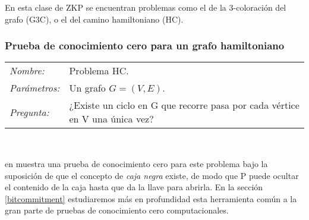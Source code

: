 \hfil

En esta clase de ZKP se encuentran problemas como el de la 3-coloración del grafo (G3C), o el del camino hamiltoniano (HC).


\subsubsection{Prueba de conocimiento cero para un grafo hamiltoniano}

\hfil

\begin{tabular}{|ll}
	\textit{Nombre:} & Problema HC. \\
	\textit{Parámetros:} &Un grafo $G=(V,E)$. \\
	\textit{Pregunta:} & ¿Existe un ciclo en G que recorre pasa por cada vértice en V una única vez? \\
\end{tabular}
\\

\hfil

\citeauthor{blum} en  \citep{blum} muestra una prueba de conocimiento cero para este problema bajo la suposición de que el concepto de \textit{caja negra} existe, de modo que P puede ocultar el contenido de la caja hasta que da la llave para abrirla. En la sección \ref{bitcommitment} estudiaremos más en profundidad esta herramienta común a la gran parte de pruebas de conocimiento cero computacionales.

\hfil

